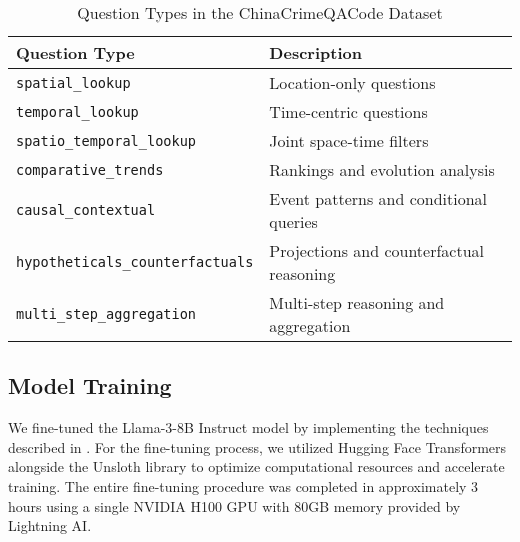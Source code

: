 \begin{table}[hbtp]
\centering
\caption{Question Types in the ChinaCrimeQACode Dataset}
\label{tab:question_types}
\begin{tabular}{ll}
\toprule
\textbf{Question Type} & \textbf{Description} \\
\midrule
\texttt{spatial\_lookup} & Location-only questions \\
\texttt{temporal\_lookup} & Time-centric questions \\
\texttt{spatio\_temporal\_lookup} & Joint space-time filters \\
\texttt{comparative\_trends} & Rankings and evolution analysis \\
\texttt{causal\_contextual} & Event patterns and conditional queries \\
\texttt{hypotheticals\_counterfactuals} & Projections and counterfactual reasoning \\
\texttt{multi\_step\_aggregation} & Multi-step reasoning and aggregation \\
\bottomrule
\end{tabular}
\end{table}


\subsection{Model Training}

We fine-tuned the Llama-3-8B Instruct model \cite{Grattafiori2024Llama3, Unsloth2024WhatModel} by implementing the techniques described in \cite{Pareja2024RecipesSFT}. For the fine-tuning process, we utilized Hugging Face Transformers alongside the Unsloth library to optimize computational resources and accelerate training. The entire fine-tuning procedure was completed in approximately 3 hours using a single NVIDIA H100 GPU with 80GB memory provided by Lightning AI.

